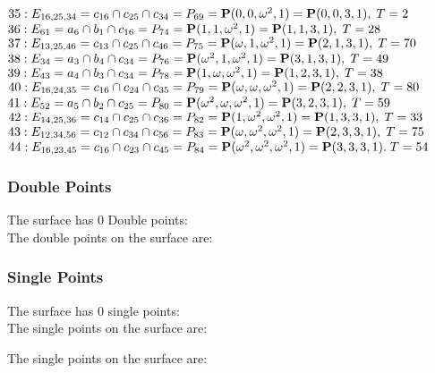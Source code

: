 \documentclass{article}
\newcommand{\bP}{{\bf P}}
\begin{document}
{$35 : E_{16,25,34}=c_{16} \cap c_{25} \cap c_{34} = P_{69}=\bP(0, 0, \omega^{2}, 1) = \bP(0, 0, 3, 1),\; T= 2$\\
$36 : E_{61}=a_{6} \cap b_{1} \cap c_{16} = P_{74}=\bP(1, 1, \omega^{2}, 1) = \bP(1, 1, 3, 1),\; T= 28$\\
$37 : E_{13,25,46}=c_{13} \cap c_{25} \cap c_{46} = P_{75}=\bP(\omega , 1, \omega^{2}, 1) = \bP(2, 1, 3, 1),\; T= 70$\\
$38 : E_{34}=a_{3} \cap b_{4} \cap c_{34} = P_{76}=\bP(\omega^{2}, 1, \omega^{2}, 1) = \bP(3, 1, 3, 1),\; T= 49$\\
$39 : E_{43}=a_{4} \cap b_{3} \cap c_{34} = P_{78}=\bP(1, \omega , \omega^{2}, 1) = \bP(1, 2, 3, 1),\; T= 38$\\
$40 : E_{16,24,35}=c_{16} \cap c_{24} \cap c_{35} = P_{79}=\bP(\omega , \omega , \omega^{2}, 1) = \bP(2, 2, 3, 1),\; T= 80$\\
$41 : E_{52}=a_{5} \cap b_{2} \cap c_{25} = P_{80}=\bP(\omega^{2}, \omega , \omega^{2}, 1) = \bP(3, 2, 3, 1),\; T= 59$\\
$42 : E_{14,25,36}=c_{14} \cap c_{25} \cap c_{36} = P_{82}=\bP(1, \omega^{2}, \omega^{2}, 1) = \bP(1, 3, 3, 1),\; T= 33$\\
$43 : E_{12,34,56}=c_{12} \cap c_{34} \cap c_{56} = P_{83}=\bP(\omega , \omega^{2}, \omega^{2}, 1) = \bP(2, 3, 3, 1),\; T= 75$\\
$44 : E_{16,23,45}=c_{16} \cap c_{23} \cap c_{45} = P_{84}=\bP(\omega^{2}, \omega^{2}, \omega^{2}, 1) = \bP(3, 3, 3, 1).\; T= 54$\\
\subsubsection*{Double Points}
The surface has 0 Double points:\\
The double points on the surface are:\\
\begin{multicols}{2}
\noindent
\end{multicols}
\subsubsection*{Single Points}
The surface has 0 single points:\\
The single points on the surface are:\\
\begin{multicols}{2}
\noindent
\end{multicols}
The single points on the surface are:\\
}
\end{document}
